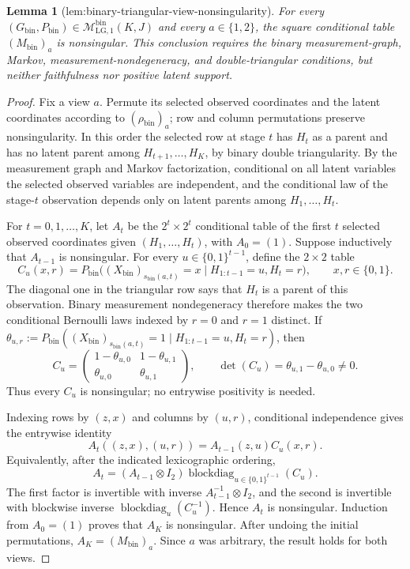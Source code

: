 \documentclass{article}
\newtheorem{lemma}{Lemma}
\begin{document}
\begin{lemma}[lem:binary-triangular-view-nonsingularity]\label{lem:binary-triangular-view-nonsingularity}
For every
\((G_{\mathrm{bin}},P_{\mathrm{bin}})\in
\mathcal M_{\mathrm{LG},1}^{\mathrm{bin}}(K,J)\) and every
\(a\in\{1,2\}\), the square conditional table
\((M_{\mathrm{bin}})_a\) is nonsingular.  This conclusion requires the
binary measurement-graph, Markov, measurement-nondegeneracy, and
double-triangular conditions, but neither faithfulness nor positive latent
support.
\end{lemma}
\begin{proof}
Fix a view \(a\).  Permute its selected observed coordinates and the latent
coordinates according to \((\rho_{\mathrm{bin}})_a\); row and column
permutations preserve nonsingularity.  In this order the selected row at stage
\(t\) has \(H_t\) as a parent and has no latent parent among
\(H_{t+1},\ldots,H_K\), by binary double triangularity.  By the measurement
graph and Markov factorization, conditional on all latent variables the
selected observed variables are independent, and the conditional law of the
stage-\(t\) observation depends only on latent parents among
\(H_1,\ldots,H_t\).

For \(t=0,1,\ldots,K\), let \(A_t\) be the \(2^t\times2^t\) conditional
table of the first \(t\) selected observed coordinates given
\((H_1,\ldots,H_t)\), with \(A_0=(1)\).  Suppose inductively that
\(A_{t-1}\) is nonsingular.  For every
\(u\in\{0,1\}^{t-1}\), define the \(2\times2\) table
\[
 C_u(x,r)=P_{\mathrm{bin}}
 \bigl((X_{\mathrm{bin}})_{s_{\mathrm{bin}}(a,t)}=x
       \mid H_{1:t-1}=u,H_t=r\bigr),
 \qquad x,r\in\{0,1\}.
\]
The diagonal one in the triangular row says that \(H_t\) is a parent of this
observation.  Binary measurement nondegeneracy therefore makes the two
conditional Bernoulli laws indexed by \(r=0\) and \(r=1\) distinct.  If
\(\theta_{u,r}:=P_{\mathrm{bin}}((X_{\mathrm{bin}})_{s_{\mathrm{bin}}(a,t)}=1
\mid H_{1:t-1}=u,H_t=r)\), then
\[
 C_u=
 \begin{pmatrix}
 1-\theta_{u,0}&1-\theta_{u,1}\\
 \theta_{u,0}&\theta_{u,1}
 \end{pmatrix},
 \qquad
 \det(C_u)=\theta_{u,1}-\theta_{u,0}\neq0.
\]
Thus every \(C_u\) is nonsingular; no entrywise positivity is needed.

Indexing rows by \((z,x)\) and columns by \((u,r)\), conditional independence
gives the entrywise identity
\[
 A_t((z,x),(u,r))=A_{t-1}(z,u)C_u(x,r).
\]
Equivalently, after the indicated lexicographic ordering,
\[
 A_t=(A_{t-1}\otimes I_2)
     \operatorname{blockdiag}_{u\in\{0,1\}^{t-1}}(C_u).
\]
The first factor is invertible with inverse
\(A_{t-1}^{-1}\otimes I_2\), and the second is invertible with blockwise
inverse \(\operatorname{blockdiag}_u(C_u^{-1})\).  Hence \(A_t\) is
nonsingular.  Induction from \(A_0=(1)\) proves that \(A_K\) is nonsingular.
After undoing the initial permutations, \(A_K=(M_{\mathrm{bin}})_a\).  Since
\(a\) was arbitrary, the result holds for both views.
\end{proof}
\end{document}
